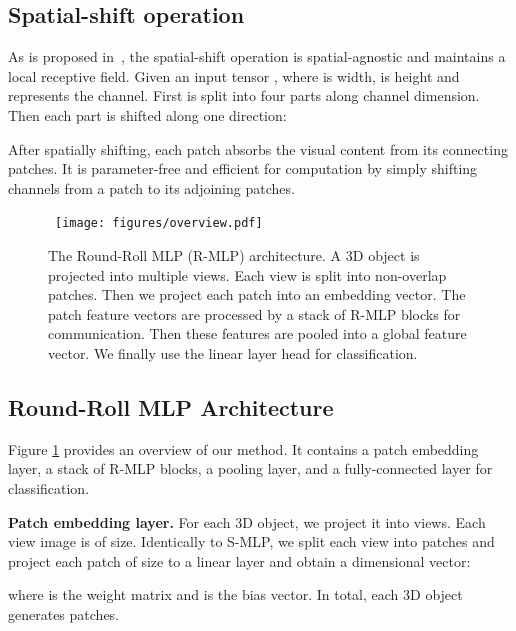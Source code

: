 \documentclass[11pt]{article}
\begin{document}
\subsection{Spatial-shift operation}

As is proposed in~\citet{yu2022s2mlp}, the spatial-shift operation is spatial-agnostic and maintains a local receptive field.
Given an input tensor , where  is width,  is height and  represents the channel. First  is split into four parts  along channel dimension. Then each part is shifted along one direction:

After spatially shifting, each patch absorbs the visual content from its connecting patches. It is parameter-free and efficient for computation by simply shifting channels from a patch to its adjoining patches.


\begin{figure}[ht]

\centering
\mbox{
     \texttt{[image: figures/overview.pdf]}
}

\vspace{0.2in}

     \caption{
    The Round-Roll MLP (R-MLP) architecture. A 3D object is projected into multiple views. Each view is split into non-overlap patches. Then we project each patch into an embedding vector. The patch feature vectors are processed by a stack of  R-MLP blocks for communication. Then these features are pooled into a global feature vector. We finally use the linear layer head for classification.}
     \label{fig:overview}
 \end{figure}

\subsection{Round-Roll MLP Architecture}
Figure \ref{fig:overview}  provides an overview of our method. It contains a patch embedding layer, a stack of  R-MLP blocks, a pooling layer, and a fully-connected layer for classification.

\vspace{0.2in}\noindent\textbf{Patch embedding layer.}
For each 3D object, we project it into  views. Each view image  is of  size. Identically to S-MLP, we split each view into  patches and project each patch of size  to a linear layer and obtain a  dimensional vector:

where  is the weight matrix and  is the bias vector.
In total, each 3D object generates  patches.
\end{document}
